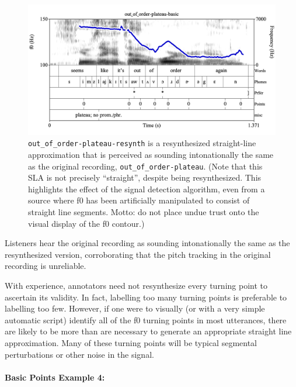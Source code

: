 \documentclass[11pt, twoside]{memoir}
\begin{document}
\begin{figure}[H]
\centering
%
\includegraphics[width=.875\linewidth]{Points-out_of_order-plateau-resynth-basic.png}
%
\caption[\texttt{out\_of\_order-plateau-resynth} is a resynthesized straight-line approximation that is perceived as sounding intonationally the same as the original recording, \texttt{out\_of\_order-plateau}.]{\texttt{out\_of\_order-plateau-resynth} is a resynthesized straight-line approximation that is perceived as sounding intonationally the same as the original recording, \texttt{out\_of\_order-plateau}. (Note that this SLA is not precisely “straight”, despite being resynthesized. This highlights the effect of the signal detection algorithm, even from a source where f0 has been artificially manipulated to consist of straight line segments. Motto: do not place undue trust onto the visual display of the f0 contour.)%
\label{fig:out_of_order-plateau Points basic resynth}%
%
}
\end{figure}

Listeners hear the original recording as sounding intonationally the same as the resynthesized version, corroborating that the pitch tracking in the original recording is unreliable.

With experience, annotators need not resynthesize every turning point to ascertain its validity. In fact, labelling too many turning points is preferable to labelling too few. However, if one were to visually (or with a very simple automatic script) identify all of the f0 turning points in most utterances, there are likely to be more than are necessary to generate an appropriate straight line approximation. Many of these turning points will be typical segmental perturbations or other noise in the signal.

\paragraph{Basic Points Example 4:\label{basic-points-example-4}}
\end{document}
